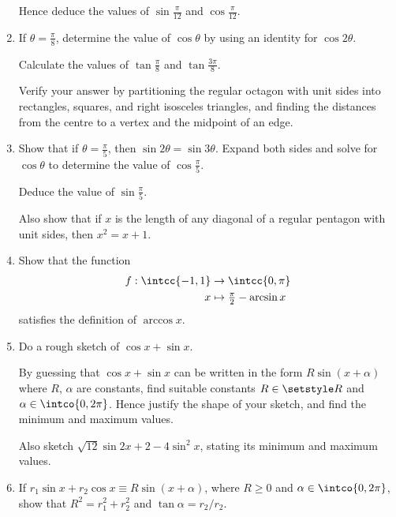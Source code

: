 \begin{enumerate}
  Hence deduce the values of \(\sin \frac \pi{12}\) and \(\cos \frac \pi{12}\).
 \item
  If \(\theta = \frac \pi 8\), determine the value of
  \(\cos \theta\) by using an identity for \(\cos 2\theta\).

  Calculate the values of \(\tan \frac \pi 8\) and \(\tan \frac{3\pi}8\).

  Verify your answer by partitioning the regular octagon with unit sides into
  rectangles, squares, and right isosceles triangles, and finding the distances
  from the centre to a vertex and the midpoint of an edge.
 \item
  Show that if \(\theta = \frac \pi 5\), then \(\sin 2\theta = \sin 3\theta\).
  Expand both sides and solve for \(\cos \theta\) to determine the value of
  \(\cos \frac \pi 5\).

  Deduce the value of \(\sin \frac \pi 5\).

  Also show that if \(x\) is the length of any diagonal of a regular pentagon
  with unit sides, then \(x^2 = x + 1\).
 \item \label{q_trig_arcsin}
  Show that the function
  \begin{align*}
   f : \intcc{-1, 1} &\to \intcc{0, \pi} \\
   x &\mapsto \tfrac \pi 2 - \arcsin x
  \end{align*}
  satisfies the definition of \(\arccos x\).
 \item
  Do a rough sketch of \(\cos x + \sin x\).

  By guessing that \(\cos x + \sin x\) can be written in the form
  \(R \sin(x + \alpha)\) where \(R\), \(\alpha\) are constants, find
  suitable constants \(R \in \Reals\) and \(\alpha \in \intco{0, 2\pi}\). Hence
  justify the shape of your sketch, and find the minimum and maximum values.

  Also sketch \(\sqrt{12} \sin 2x + 2 - 4\sin^2 x\), stating its minimum and
  maximum values.
 \item
  If \(r_1 \sin x + r_2 \cos x \equiv R \sin(x + \alpha)\), where
  \(R \ge 0\) and \(\alpha \in \intco{0, 2 \pi}\), show that
  \(R^2 = r_1^2 + r_2^2\) and \(\tan \alpha = r_2 / r_2\).


\end{enumerate}

